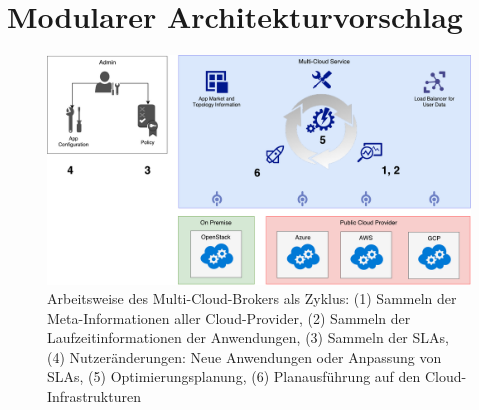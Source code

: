 \section{Modularer Architekturvorschlag}

%
%
%

\begin{figure}
	\centering	
	\includegraphics[width=\linewidth]{images/broker-cycle}
	\caption{Arbeitsweise des Multi-Cloud-Brokers als Zyklus: (1) Sammeln der Meta-Informationen aller Cloud-Provider, (2) Sammeln der Laufzeitinformationen der Anwendungen, (3) Sammeln der SLAs, (4) Nutzeränderungen: Neue Anwendungen oder Anpassung von SLAs, (5) Optimierungsplanung, (6) Planausführung auf den Cloud-Infrastrukturen}
	\label{fig:cycle}
\end{figure}


